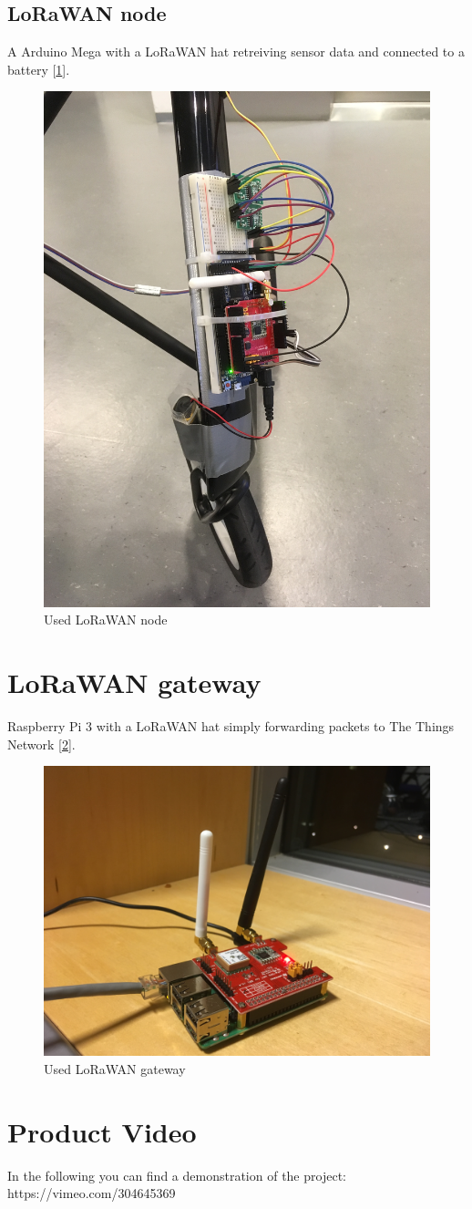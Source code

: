 \subsection{LoRaWAN node}
A Arduino Mega with a LoRaWAN hat retreiving sensor data and connected to a battery [\ref{fig:walkerpictures_node}].
\begin{figure}[h!]
	\centering
	\includegraphics[width=0.7\linewidth]{gfx/walkerpictures/node}
	\caption{Used LoRaWAN node}
	\label{fig:walkerpictures_node}
\end{figure}
\newpage

\section{LoRaWAN gateway}
Raspberry Pi 3 with a LoRaWAN hat simply forwarding packets to The Things Network [\ref{fig:walkerpictures_gateway}].
\begin{figure}[h!]
	\centering
	\includegraphics[width=0.7\linewidth]{gfx/walkerpictures/gateway}
	\caption{Used LoRaWAN gateway}
	\label{fig:walkerpictures_gateway}
\end{figure}

\section{Product Video}
In the following you can find a demonstration of the project:\\
https://vimeo.com/304645369

